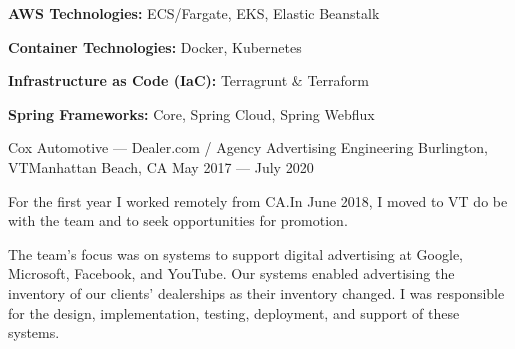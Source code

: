 \vspace{-2.00mm}
\begin{cventries}
    {} %
    {} %
    {} %
    {%
      \begin{cvitems} %
        \item {\textbf{AWS Technologies:} ECS/Fargate, EKS, Elastic Beanstalk}
        \item {\textbf{Container Technologies:} Docker, Kubernetes}
        \item {\textbf{Infrastructure as Code (IaC):} Terragrunt \& Terraform}
        \item {\textbf{Spring Frameworks:} Core, Spring Cloud, Spring Webflux}
      \end{cvitems}
    }


    {Cox Automotive --- Dealer.com / Agency Advertising Engineering} %
    {Burlington, VT{\vspace{1mm}\newline}Manhattan Beach, CA} %
    {May 2017 --- July 2020} %
    {}
\end{cventries}
\vspace{-6.00mm}

\begin{cvparagraph}
For the first year I worked remotely from CA.\@ In June 2018, I moved to VT do be with the team and
to seek opportunities for promotion.
\end{cvparagraph}

\vspace{-1.00mm}

\begin{cvparagraph}
The team's focus was on systems to support digital advertising at Google, Microsoft, Facebook, and YouTube.\@
Our systems enabled advertising the inventory of our clients' dealerships as their inventory changed.\@
I was responsible for the design, implementation, testing, deployment, and support of these systems.
\end{cvparagraph}

